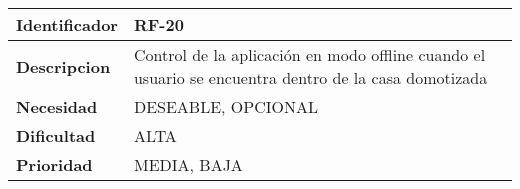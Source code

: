 \begin{center}
    \begin{tabular}{|p{2.6cm}|p{12cm}|}
    \hline
    \textbf{Identificador} & RF-20\\
    \hline
    \textbf{Descripcion} & Control de la aplicación en modo offline cuando el usuario se encuentra dentro de la casa domotizada\\
    \hline
    \textbf{Necesidad} & DESEABLE, OPCIONAL\\
    \hline
    \textbf{Dificultad} & ALTA\\
    \hline
    \textbf{Prioridad} & MEDIA, BAJA\\
    \hline
    \end{tabular}
\end{center}
